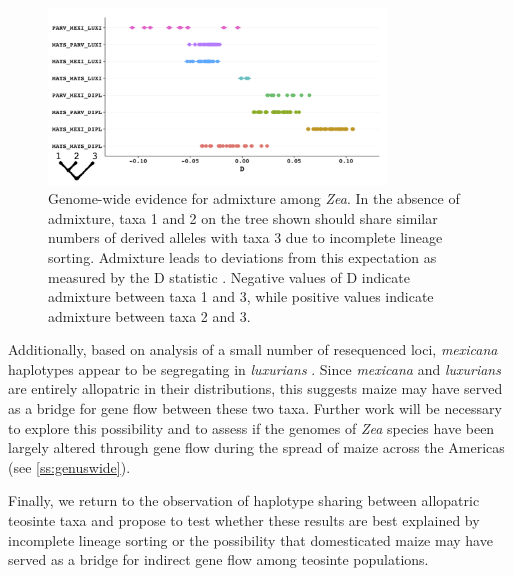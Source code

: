 \begin{figure}[]
  \centering
   \includegraphics[width=0.8\textwidth]{abbas}
    \caption{Genome-wide evidence for admixture among \emph{Zea}. In the absence of admixture, taxa 1 and 2 on the tree shown should share similar numbers of derived alleles with taxa 3 due to incomplete lineage sorting.  Admixture leads to deviations from this expectation as measured by the D statistic  \citep{green2010draft}. Negative values of D indicate admixture between taxa 1 and 3, while positive values indicate admixture between taxa 2 and 3.} 
\label{fig:abba}
\end{figure}

Additionally, based on analysis of a small number of resequenced loci, \emph{mexicana} haplotypes appear to be segregating in \emph{luxurians} \citep{Ross-Ibarra2009a}.  
Since \emph{mexicana} and \emph{luxurians} are entirely allopatric in their distributions, this suggests maize may have served as a bridge for gene flow between these two taxa.  
Further work will be necessary to explore this possibility and to assess if the genomes of \emph{Zea} species have been largely altered through gene flow during the spread of maize across the Americas (see \ref{ss:genuswide}).

Finally, we return to the observation of haplotype sharing between allopatric teosinte taxa \citep{Ross-Ibarra2009a} and propose to test whether these results are best explained by incomplete lineage sorting or the possibility that domesticated maize may have served as a bridge for indirect gene flow among teosinte populations. 

